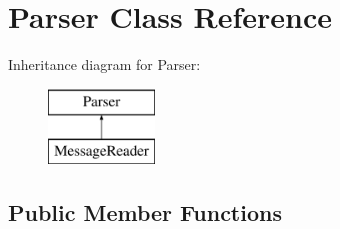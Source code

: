 \hypertarget{class_parser}{}\section{Parser Class Reference}
\label{class_parser}
Inheritance diagram for Parser\+:\begin{figure}[H]
\begin{center}
\leavevmode
\includegraphics[height=2.000000cm]{class_parser}
\end{center}
\end{figure}
\subsection*{Public Member Functions}
